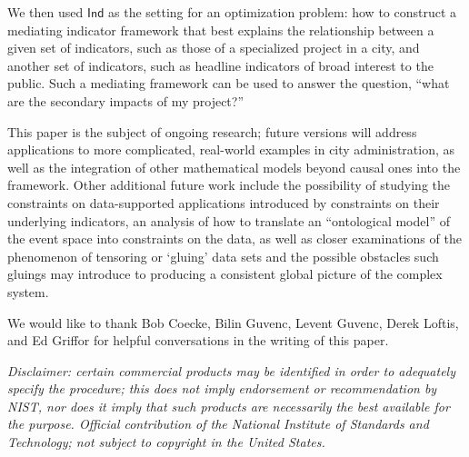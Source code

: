 \documentclass[sigconf]{acmart}
\newcommand{\Cat}[1]{\mathsf{#1}}
\def\Ind{\Cat{Ind}}
\begin{document}
We then used $\Ind$ as the setting for an optimization problem: how to construct a mediating indicator framework that best explains the relationship between a given set of indicators, such as those of a specialized project in a city, and another set of indicators, such as headline indicators of broad interest to the public. Such a mediating framework can be used to answer the question, ``what are the secondary impacts of my project?''

This paper is the subject of ongoing research; future versions will address applications to more complicated, real-world examples in city administration, as well as the integration of other mathematical models beyond causal ones into the framework. Other additional future work include the possibility of studying the constraints on data-supported applications introduced by constraints on their underlying indicators, an analysis of how to translate an ``ontological model'' of the event space into constraints on the data, as well as closer examinations of the phenomenon of tensoring or `gluing' data sets and the possible obstacles such gluings may introduce to producing a consistent global picture of the complex system.


\begin{acks}
We would like to thank Bob Coecke, Bilin Guvenc, Levent Guvenc, Derek Loftis, and Ed Griffor for helpful conversations in the writing of this paper.

\emph{Disclaimer: certain commercial products may be identified in order to adequately specify the procedure; this does not imply endorsement or recommendation by NIST, nor does it imply that such products are necessarily the best available for the purpose. Official contribution of the National Institute of Standards and Technology; not subject to copyright in the United States.}
\end{acks}

\balance %
%

 
\end{document}

